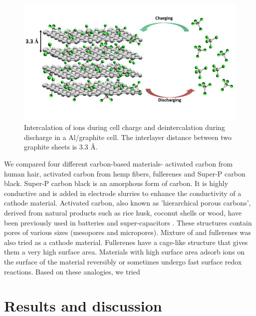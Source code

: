 
 \begin{figure}[tbh!]
  \centering
  \includegraphics[width=\textwidth]{Figures/chap5fig/graphmech}
    \caption{Intercalation of  ions during cell charge and deintercalation during discharge in a Al/graphite cell. The interlayer distance between two graphite sheets is 3.3 \AA.}
  \label{Figures/chap5fig:graphmech}
\end{figure}

We compared four different carbon-based materials- activated carbon from human hair, activated carbon from hemp fibers, fullerenes and Super-P carbon black. Super-P carbon black is an amorphous form of carbon. It is highly conductive and is added in electrode slurries to enhance the conductivity of a cathode material. Activated carbon, also known as 'hierarchical porous carbons', derived from natural products such as rice husk, coconut shells or wood, have been previously used in batteries and super-capacitors \cite{hussain_development_2019, frackowiak_carbon_2001}. These structures contain pores of various sizes (mesopores and micropores). Mixture of  and  fullerenes was also tried as a cathode material. Fullerenes have a cage-like structure that gives them a very high surface area. Materials with high surface area adsorb ions on the surface of the material reversibly or sometimes undergo fast surface redox reactions. Based on these analogies, we tried  

\section{Results and discussion}

